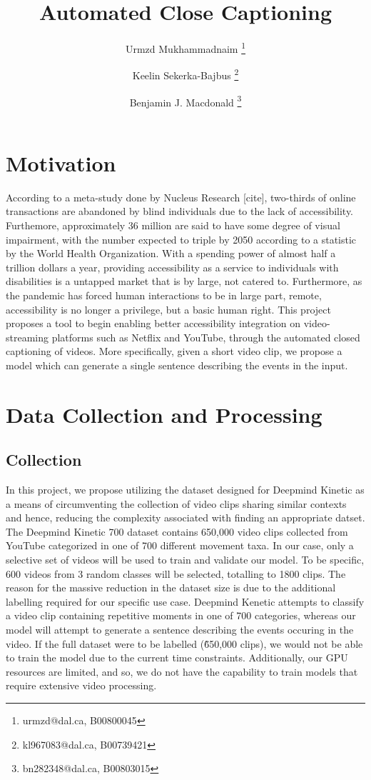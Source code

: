 \documentclass[11pt]{article}
\title{Automated Close Captioning}
\author[1]{Urmzd Mukhammadnaim \thanks{urmzd@dal.ca, B00800045}}
\author[1]{Keelin Sekerka-Bajbus \thanks{kl967083@dal.ca, B00739421 }}
\author[1]{Benjamin J. Macdonald \thanks{bn282348@dal.ca, B00803015}}
\affil[1]{Faculty of Computer Science, Dalhousie University}
\begin{document}
\maketitle

\section{Motivation}
According to a meta-study done by Nucleus Research [cite], two-thirds
of online transactions are abandoned by blind individuals due to the lack of accessibility.
Furthemore, approximately 36 million are said to have some degree of visual impairment, with the number
expected to triple by 2050 according to a statistic by the World Health Organization.
With a spending power of almost half a trillion dollars a year, providing accessibility
as a service to individuals with disabilities is a untapped market that is by large, not catered to.
Furthermore, as the pandemic has forced human interactions to be in large part, remote, accessibility is no longer
a privilege, but a basic human right. This project proposes a tool to begin enabling better accessibility
integration on video-streaming platforms such as Netflix and YouTube, through the automated
closed captioning of videos. More specifically, given a short video clip, we propose a model which
can generate a single sentence describing the events in the input.

\newpage
\section{Data Collection and Processing}
\subsection{Collection}
In this project, we propose utilizing the dataset designed for Deepmind Kinetic as a means of
circumventing the collection of video clips sharing similar contexts and hence, reducing the complexity associated
with finding an appropriate datset. The Deepmind Kinetic 700 dataset contains 650,000 video clips collected from YouTube
categorized in one of 700 different movement taxa. In our case, only a selective set of videos will be used to train and validate
our model. To be specific, 600 videos from 3 random classes will be selected, totalling
to 1800 clips. The reason for the massive reduction in the dataset size is due to the additional labelling
required for our specific use case. Deepmind Kenetic attempts to classify a video clip containing repetitive moments
in one of 700 categories, whereas our model will attempt to generate a sentence describing the events occuring in the video.
If the full dataset were to be labelled (\~650,000 clips), we would not be able to train the model due to the current time
constraints. Additionally, our GPU resources are limited, and so, we do not have the capability to train models
that require extensive video processing.
\end{document}
